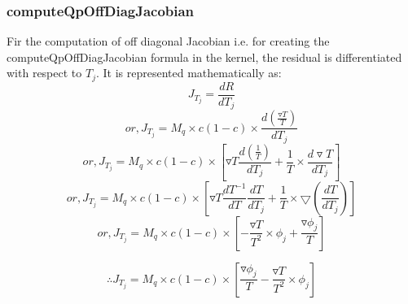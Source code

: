 \documentclass[10pt,a4paper]{article}
\begin{document}
\subsubsection{computeQpOffDiagJacobian}
Fir the computation of off diagonal Jacobian i.e. for creating the computeQpOffDiagJacobian formula in the kernel, the residual is differentiated with respect to $T_j$. It is represented mathematically as:
\begin{equation}
  J_{T_j} = \frac{dR}{dT_j}
  \end{equation}
  \begin{displaymath}
      or, J_{T_j} = M_q \times c(1-c) \times \frac{d (\frac{\triangledown T}{T})}{dT_j} 
 \end{displaymath}
  \begin{displaymath}
      or, J_{T_j} = M_q \times c(1-c) \times [\triangledown T \frac{d (\frac{1}{T})}{dT_j} + \frac{1}{T} \times \frac{d\triangledown T}{dT_j}]
 \end{displaymath}
 \begin{displaymath}
      or, J_{T_j} = M_q \times c(1-c) \times [\triangledown T \frac{dT^{-1}}{dT} \frac{dT}{dT_j} + \frac{1}{T} \times \bigtriangledown (\frac{dT}{dT_j})]
 \end{displaymath}
 \begin{displaymath}
 or, J_{T_j} = M_q \times c(1-c) \times [-\frac{\triangledown T}{T^2} \times \phi_j + \frac{\triangledown \phi_j}{T}]
 \end{displaymath}
 
 \begin{equation}
 \therefore J_{T_j} = M_q \times c(1-c) \times [\frac{\triangledown \phi_j}{T} - \frac{\triangledown T}{T^2} \times \phi_j]
 \end{equation}
 
  
\end{document}
